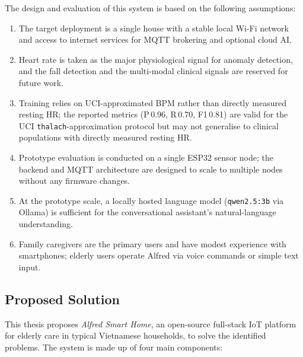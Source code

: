 The design and evaluation of this system is based on the following assumptions:
\begin{enumerate}
\item The target deployment is a single house with a stable local Wi-Fi network and access to internet services for MQTT brokering and optional cloud AI.

\item Heart rate is taken as the major physiological signal for anomaly detection, and the fall detection and the multi-modal clinical signals are reserved for future work.

\item Training relies on UCI-approximated BPM rather than directly measured resting HR; the reported metrics (P\,0.96, R\,0.70, F1\,0.81) are valid for the UCI \texttt{thalach}-approximation protocol but may not generalise to clinical populations with directly measured resting HR.

\item Prototype evaluation is conducted on a single ESP32 sensor node; the backend and MQTT architecture are designed to scale to multiple nodes without any firmware changes.

\item At the prototype scale, a locally hosted language model (\texttt{qwen2.5:3b} via Ollama) is sufficient for the conversational assistant's natural-language understanding.

\item Family caregivers are the primary users and have modest experience with smartphones; elderly users operate Alfred via voice commands or simple text input.

\end{enumerate}


\subsection{Proposed Solution}

This thesis proposes \textit{Alfred Smart Home}, an open-source full-stack IoT platform for elderly care in typical Vietnamese households, to solve the identified problems. The system is made up of four main components:

